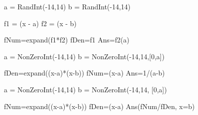 



\begin{sagesilent}
a = RandInt(-14,14)
b = RandInt(-14,14)

f1 = (x - a)
f2 = (x - b)



fNum=expand(f1*f2)
fDen=f1
Ans=f2(a)
\end{sagesilent}



\begin{sagesilent}
a = NonZeroInt(-14,14)
b = NonZeroInt(-14,14,[0,a])

fDen=expand((x-a)*(x-b))
fNum=(x-a)
Ans=1/(a-b)
\end{sagesilent}




\begin{sagesilent}
a = NonZeroInt(-14,14)
b = NonZeroInt(-14,14, [0,a])

fNum=expand((x-a)*(x-b))
fDen=(x-a)
Ans(fNum/fDen, x=b)
\end{sagesilent}

